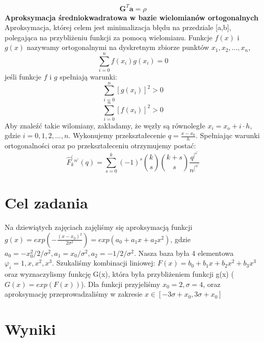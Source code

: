\documentclass{article}
\begin{document}
\begin{equation}
\textbf{G}^T \textbf{a} =\rho
\end{equation}
\newline
\textbf{Aproksymacja średniokwadratowa w bazie wielomianów ortogonalnych}
\newline
 Aproksymacja, której celem jest minimalizacja błędu na przedziale [a,b], polegająca na przybliżeniu funkcji za pomocą wielomianu. Funkcje $f(x)$ i $g(x)$ nazywamy ortogonalnymi
 na dyskretnym zbiorze punktów $x_1
,x_2,...,x_n$, \[\sum_{i=0}^{n} f(x_i)g(x_i)=0\] jeśli funkcje $f$ i $g$ spełniają warunki:
\[ \sum_{i=0}^{n} [g(x_i)]^2 > 0 \] \[ \sum_{i=0}^{n} [f(x_i)]^2 > 0 \]
\newline
Aby znaleźć takie wilomiany, zakładamy, że węzły są równoległe $x_i=x_o+i\cdot h$, gdzie $i=0,1,2,...,n$. Wykonujemy przekształecenie $q=\frac{x-x_0}{h}$. Spełniając warunki ortogonalności oraz po przekształeceniu otrzymujemy postać:
\[ \widehat{F}_k^(^n^) (q)=\sum_{s=0}^{k} (-1)^s {k \choose s} {k+s \choose s}\frac{q^[^s^]}{n^[^n^]} \]
\newline


\section{Cel zadania}
Na dziewiątych zajęciach zajęliśmy się aproksymacją funkcji $g(x)=exp(-\frac{(x-x_0)^2}{2\sigma^2})=exp(a_0+a_1x+a_2x^2)$, gdzie $a_0=-x_0^2/2/\sigma^2, a_1 = x_0/\sigma^2, a_2=-1/2/\sigma^2$. Nasza baza była 4 elementowa ${\varphi_i}={1,x,x^2,x^3}$. Szukaliśmy kombinacji liniowej: $F(x)=b_0+b_1x+b_2x^2+b_3x^3$ oraz wyznaczylismy funkcję G(x), która była przybliżeniem funkcji g(x) ($G(x)=exp(F(x))$). Dla funkcji przyjeliśmy $x_0=2, \sigma=4$, oraz aproksymację przeprowadzaliśmy w zakresie $x\in [-3\sigma+x_0, 3\sigma+x_0]$

\section{Wyniki}
\end{document}
